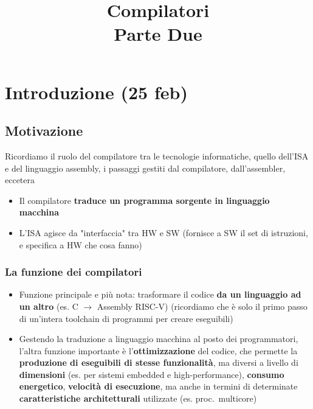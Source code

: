 

\title{%
Compilatori\\
\large Parte Due}


\maketitle
\tableofcontents
\newpage
\section{Introduzione (25 feb)}

\subsection{Motivazione}

Ricordiamo il ruolo del compilatore tra le tecnologie informatiche, quello dell'ISA e del linguaggio assembly, i passaggi gestiti dal compilatore, dall'assembler, eccetera
\begin{itemize}
  \item Il compilatore \textbf{traduce un programma sorgente in linguaggio macchina}
  \item L'ISA agisce da "interfaccia" tra HW e SW (fornisce a SW il set di istruzioni, e specifica a HW che cosa fanno)
\end{itemize}

\subsubsection{La funzione dei compilatori}

\begin{itemize}
  \item Funzione principale e pi\`u nota: trasformare il codice \textbf{da un linguaggio ad un altro} (es. C $\rightarrow$ Assembly RISC-V) (ricordiamo che \`e solo il primo passo di un'intera toolchain di programmi per creare eseguibili)

\item Gestendo la traduzione a linguaggio macchina al posto dei programmatori, l'altra funzione importante \`e l'\textbf{ottimizzazione} del codice, che permette la \textbf{produzione di eseguibili di stesse funzionalit\`a}, ma diversi a livello di \textbf{dimensioni} (es. per sistemi embedded e high-performance), \textbf{consumo energetico}, \textbf{velocit\`a di esecuzione}, ma anche in termini di determinate \textbf{caratteristiche architetturali} utilizzate (es. proc.~multicore)
\end{itemize}


